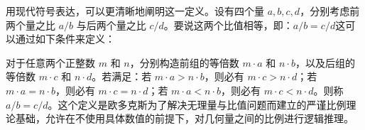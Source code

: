 用现代符号表达，可以更清晰地阐明这一定义。设有四个量 $a, b, c, d$，分别考虑前两个量之比 $a/b$ 与后两个量之比 $c/d$。要说这两个比值相等，即：$a/b = c/d$这可以通过如下条件来定义：

对于任意两个正整数 $m$ 和 $n$，分别构造前组的等倍数 $m \cdot a$ 和 $n \cdot b$，以及后组的等倍数 $m \cdot c$ 和 $n \cdot d$。若满足：若 $m \cdot a > n \cdot b$，则必有 $m \cdot c > n \cdot d$；若 $m \cdot a = n \cdot b$，则必有 $m \cdot c = n \cdot d$；若 $m \cdot a < n \cdot b$，则必有 $m \cdot c < n \cdot d$。则称 $a/b = c/d$。这个定义是欧多克斯为了解决无理量与比值问题而建立的严谨比例理论基础，允许在不使用具体数值的前提下，对几何量之间的比例进行逻辑推理。
